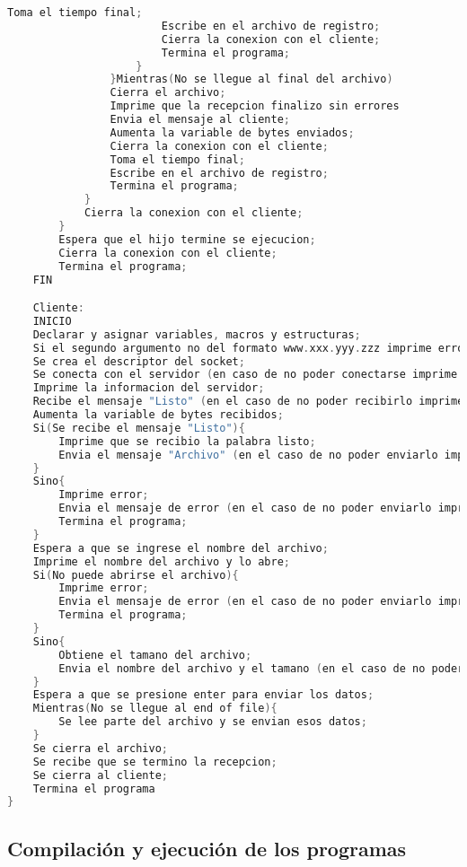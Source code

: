 \begin{lstlisting}[language=C]
                        Toma el tiempo final;
                        Escribe en el archivo de registro;
                        Cierra la conexion con el cliente;
                        Termina el programa;
                    }
                }Mientras(No se llegue al final del archivo)
                Cierra el archivo;
                Imprime que la recepcion finalizo sin errores
                Envia el mensaje al cliente;
                Aumenta la variable de bytes enviados;
                Cierra la conexion con el cliente;
                Toma el tiempo final;
                Escribe en el archivo de registro;
                Termina el programa;
            }
            Cierra la conexion con el cliente;
        }
        Espera que el hijo termine se ejecucion;
        Cierra la conexion con el cliente;
        Termina el programa;
    FIN

    Cliente:
    INICIO
    Declarar y asignar variables, macros y estructuras;
    Si el segundo argumento no del formato www.xxx.yyy.zzz imprime error;
    Se crea el descriptor del socket;
    Se conecta con el servidor (en caso de no poder conectarse imprime error);
    Imprime la informacion del servidor;
    Recibe el mensaje "Listo" (en el caso de no poder recibirlo imprime error);
    Aumenta la variable de bytes recibidos;
    Si(Se recibe el mensaje "Listo"){
        Imprime que se recibio la palabra listo;
        Envia el mensaje "Archivo" (en el caso de no poder enviarlo imprime error);
    }
    Sino{
        Imprime error;
        Envia el mensaje de error (en el caso de no poder enviarlo imprime error);
        Termina el programa;
    }
    Espera a que se ingrese el nombre del archivo;
    Imprime el nombre del archivo y lo abre;
    Si(No puede abrirse el archivo){
        Imprime error;
        Envia el mensaje de error (en el caso de no poder enviarlo imprime error);
        Termina el programa;
    }
    Sino{
        Obtiene el tamano del archivo;
        Envia el nombre del archivo y el tamano (en el caso de no poder enviarlo imprime error);
    }
    Espera a que se presione enter para enviar los datos;
    Mientras(No se llegue al end of file){
        Se lee parte del archivo y se envian esos datos;
    }
    Se cierra el archivo;
    Se recibe que se termino la recepcion;
    Se cierra al cliente;
    Termina el programa
}

\end{lstlisting}

\subsection{Compilación y ejecución de los programas}

